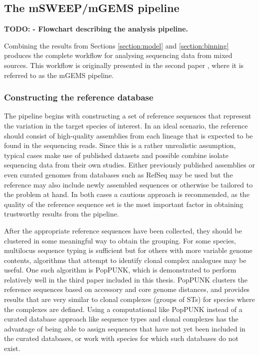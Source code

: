 \documentclass[officiallayout]{tktla}
\begin{document}
\subsection{The mSWEEP/mGEMS pipeline}

\textbf{TODO: - Flowchart describing the analysis pipeline.}

Combining the results from Sections \ref{section:model} and
\ref{section:binning} produces the complete workflow for analysing
sequencing data from mixed sources. This workflow is originally
presented in the second paper \citep{maklin_bacterial_2021}, where it
is referred to as the mGEMS pipeline.

\subsubsection{Constructing the reference database}

The pipeline begins with constructing a set of reference sequences
that represent the variation in the target species of interest. In an
ideal scenario, the reference should consist of high-quality
assemblies from each lineage that is expected to be found in the
sequencing reads. Since this is a rather unrealistic assumption,
typical cases make use of published datasets and possible combine
isolate sequencing data from their own studies. Either previously
published assemblies or even curated genomes from databases such as
RefSeq may be used but the reference may also include newly assembled
sequences or otherwise be tailored to the problem at hand. In both
cases a cautious approach is recommended, as the quality of the
reference sequence set is the most important factor in obtaining
trustworthy results from the pipeline.

After the appropriate reference sequences have been collected, they
should be clustered in some meaningful way to obtain the grouping. For
some species, multilocus sequence typing is sufficient but for others
with more variable genome contents, algorithms that attempt to
identify clonal complex analogues may be useful. One such algorithm is
PopPUNK, which is demonstrated to perform relatively well in the third
paper included in this thesis. PopPUNK clusters the reference
sequences based on accessory and core genome distances, and provides
results that are very similar to clonal complexes (groups of STs) for
species where the complexes are defined. Using a computational like
PopPUNK instead of a curated database approach like sequence types and
clonal complexes has the advantage of being able to assign sequences
that have not yet been included in the curated databases, or work with
species for which such databases do not exist.
\end{document}
